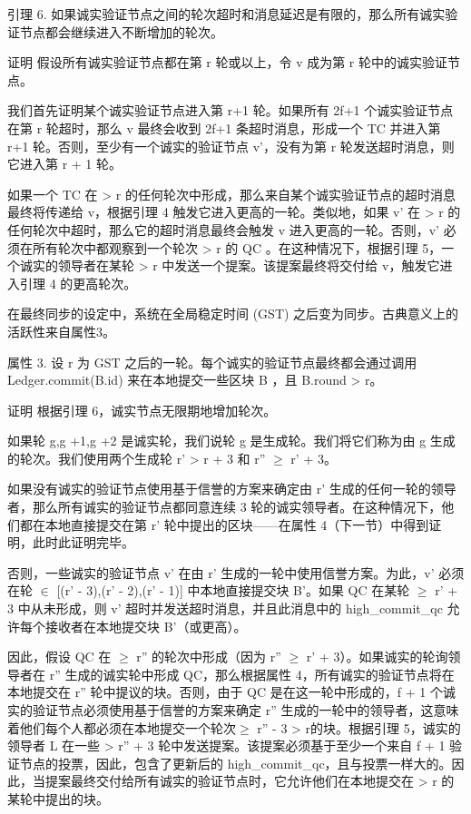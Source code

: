 引理 6. 如果诚实验证节点之间的轮次超时和消息延迟是有限的，那么所有诚实验证节点都会继续进入不断增加的轮次。

证明 假设所有诚实验证节点都在第 r 轮或以上，令 v 成为第 r 轮中的诚实验证节点。

我们首先证明某个诚实验证节点进入第 r+1 轮。如果所有 2f+1 个诚实验证节点在第 r 轮超时，那么 v 最终会收到 2f+1 条超时消息，形成一个 TC 并进入第 r+1 轮。否则，至少有一个诚实的验证节点 v'，没有为第 r 轮发送超时消息，则它进入第 r + 1 轮。

如果一个 TC 在 > r 的任何轮次中形成，那么来自某个诚实验证节点的超时消息最终将传递给 v，根据引理 4 触发它进入更高的一轮。类似地，如果 v' 在 > r 的任何轮次中超时，那么它的超时消息最终会触发 v 进入更高的一轮。否则，v' 必须在所有轮次中都观察到一个轮次 > r 的 QC 。在这种情况下，根据引理 5，一个诚实的领导者在某轮 > r 中发送一个提案。该提案最终将交付给 v，触发它进入引理 4 的更高轮次。

在最终同步的设定中，系统在全局稳定时间 (GST) 之后变为同步。古典意义上的活跃性来自属性3。

属性 3. 设 r 为 GST 之后的一轮。每个诚实的验证节点最终都会通过调用 Ledger.commit(B.id) 来在本地提交一些区块 B ，且 B.round > r。

证明 根据引理 6，诚实节点无限期地增加轮次。

如果轮 g,g +1,g +2 是诚实轮，我们说轮 g 是生成轮。我们将它们称为由 g 生成的轮次。我们使用两个生成轮 r' > r + 3 和 r'' $\geq$ r' + 3。

如果没有诚实的验证节点使用基于信誉的方案来确定由 r' 生成的任何一轮的领导者，那么所有诚实的验证节点都同意连续 3 轮的诚实领导者。在这种情况下，他们都在本地直接提交在第 r' 轮中提出的区块——在属性 4（下一节）中得到证明，此时此证明完毕。

否则，一些诚实的验证节点 v' 在由 r' 生成的一轮中使用信誉方案。为此，v' 必须在轮 $\in$ [(r' - 3),(r' - 2),(r' - 1)] 中本地直接提交块 B'。如果 QC 在某轮 $\geq$ r' + 3 中从未形成，则 v' 超时并发送超时消息，并且此消息中的 high\_commit\_qc 允许每个接收者在本地提交块 B'（或更高）。

因此，假设 QC 在 $\geq$ r'' 的轮次中形成（因为 r'' $\geq$ r' + 3）。如果诚实的轮询领导者在 r'' 生成的诚实轮中形成 QC，那么根据属性 4，所有诚实的验证节点将在本地提交在 r'' 轮中提议的块。否则，由于 QC 是在这一轮中形成的，f + 1 个诚实的验证节点必须使用基于信誉的方案来确定 r'' 生成的一轮中的领导者，这意味着他们每个人都必须在本地提交一个轮次$\geq$ r'' - 3 > r的块。根据引理 5，诚实的领导者 L 在一些 > r'' + 3 轮中发送提案。该提案必须基于至少一个来自 f + 1 验证节点的投票，因此，包含了更新后的 high\_commit\_qc，且与投票一样大的。因此，当提案最终交付给所有诚实的验证节点时，它允许他们在本地提交在 > r 的某轮中提出的块。

